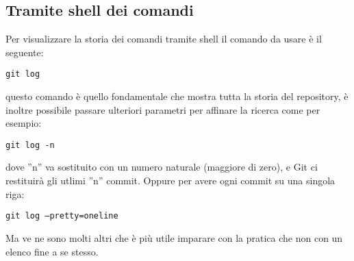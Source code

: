 \subsection{Tramite shell dei comandi}
Per visualizzare la storia dei comandi tramite shell il comando da usare è il seguente:

\begin{center}
\texttt{git log}
\end{center}

questo comando è quello fondamentale che mostra tutta la storia del repository, è inoltre possibile passare ulteriori parametri per affinare la ricerca come per esempio:

\begin{center}
\texttt{git log -n}
\end{center}

dove ''n'' va sostituito con un numero naturale (maggiore di zero), e Git ci restituirà gli utlimi ''n'' commit. Oppure per avere ogni commit su una singola riga:

\begin{center}
\texttt{git log --pretty=oneline}
\end{center}

Ma ve ne sono molti altri che è più utile imparare con la pratica che non con un elenco fine a se stesso.
